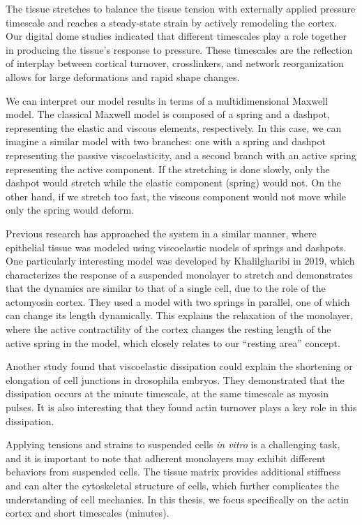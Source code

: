 The tissue stretches to balance the tissue tension with externally
applied pressure timescale and reaches a steady-state strain by actively
remodeling the cortex. Our digital dome studies indicated that different
timescales play a role together in producing the tissue's response to
pressure. These timescales are the reflection of interplay between
cortical turnover, crosslinkers, and network reorganization allows for
large deformations and rapid shape changes.

We can interpret our model results in terms of a multidimensional
Maxwell model. The classical Maxwell model is composed of a spring and a
dashpot, representing the elastic and viscous elements, respectively. In
this case, we can imagine a similar model with two branches: one with a
spring and dashpot representing the passive viscoelasticity, and a
second branch with an active spring representing the active component.
If the stretching is done slowly, only the dashpot would stretch while
the elastic component (spring) would not. On the other hand, if we
stretch too fast, the viscous component would not move while only the
spring would deform.

Previous research has approached the system in a similar manner, where
epithelial tissue was modeled using viscoelastic models of springs and
dashpots. One particularly interesting model was developed by
Khalilgharibi in 2019, which characterizes the response of a suspended
monolayer to stretch and demonstrates that the dynamics are similar to
that of a single cell, due to the role of the actomyosin cortex. They
used a model with two springs in parallel, one of which can change its
length dynamically. This explains the relaxation of the monolayer, where
the active contractility of the cortex changes the resting length of the
active spring in the model, which closely relates to our ``resting
area'' concept.

Another study found that viscoelastic dissipation could explain the
shortening or elongation of cell junctions in drosophila embryos. They
demonstrated that the dissipation occurs at the minute timescale, at the
same timescale as myosin pulses. It is also interesting that they found
actin turnover plays a key role in this dissipation.

Applying tensions and strains to suspended cells \textit{in vitro} is a
challenging task, and it is important to note that adherent monolayers
may exhibit different behaviors from suspended cells. The tissue matrix
provides additional stiffness and can alter the cytoskeletal structure
of cells, which further complicates the understanding of cell mechanics.
In this thesis, we focus specifically on the actin cortex and short
timescales (minutes).

